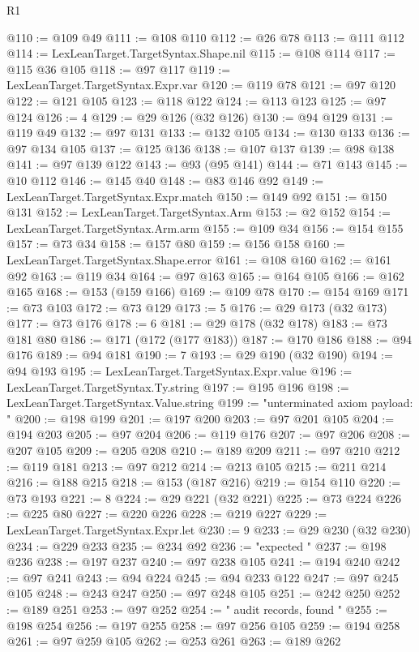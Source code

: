 \begin{lexlean}{R1}
\begin{coremodule}
{{{{{{{{{{{{{{{{{{{{{{{{{{{{{{{{{{{{{{{{{{{{{{{{{{{{{{{{{{{{{{{{{{{{{{{{{{{{{{{{{{{{{{{{{{{{{{{{{{{{{{{{{{{{{{{{{{{{{{{{{{{{{{{{{{{{{{{{{{{{{{{{{{{{{{{{{{{{{{{{{{{{{{{{{{{{{{{{{{{{{{{{{{@110 := @109 @49
@111 := @108 @110
@112 := @26 @78
@113 := @111 @112
@114 := LexLeanTarget.TargetSyntax.Shape.nil
@115 := @108 @114
@117 := @115 @36 @105
@118 := @97 @117
@119 := LexLeanTarget.TargetSyntax.Expr.var
@120 := @119 @78
@121 := @97 @120
@122 := @121 @105
@123 := @118 @122
@124 := @113 @123
@125 := @97 @124
@126 := 4
@129 := @29 @126 (@32 @126)
@130 := @94 @129
@131 := @119 @49
@132 := @97 @131
@133 := @132 @105
@134 := @130 @133
@136 := @97 @134 @105
@137 := @125 @136
@138 := @107 @137
@139 := @98 @138
@141 := @97 @139 @122
@143 := @93 (@95 @141)
@144 := @71 @143
@145 := @10 @112
@146 := @145 @40
@148 := @83 @146 @92
@149 := LexLeanTarget.TargetSyntax.Expr.match
@150 := @149 @92
@151 := @150 @131
@152 := LexLeanTarget.TargetSyntax.Arm
@153 := @2 @152
@154 := LexLeanTarget.TargetSyntax.Arm.arm
@155 := @109 @34
@156 := @154 @155
@157 := @73 @34
@158 := @157 @80
@159 := @156 @158
@160 := LexLeanTarget.TargetSyntax.Shape.error
@161 := @108 @160
@162 := @161 @92
@163 := @119 @34
@164 := @97 @163
@165 := @164 @105
@166 := @162 @165
@168 := @153 (@159 @166)
@169 := @109 @78
@170 := @154 @169
@171 := @73 @103
@172 := @73 @129
@173 := 5
@176 := @29 @173 (@32 @173)
@177 := @73 @176
@178 := 6
@181 := @29 @178 (@32 @178)
@183 := @73 @181 @80
@186 := @171 (@172 (@177 @183))
@187 := @170 @186
@188 := @94 @176
@189 := @94 @181
@190 := 7
@193 := @29 @190 (@32 @190)
@194 := @94 @193
@195 := LexLeanTarget.TargetSyntax.Expr.value
@196 := LexLeanTarget.TargetSyntax.Ty.string
@197 := @195 @196
@198 := LexLeanTarget.TargetSyntax.Value.string
@199 := "unterminated axiom payload: "
@200 := @198 @199
@201 := @197 @200
@203 := @97 @201 @105
@204 := @194 @203
@205 := @97 @204
@206 := @119 @176
@207 := @97 @206
@208 := @207 @105
@209 := @205 @208
@210 := @189 @209
@211 := @97 @210
@212 := @119 @181
@213 := @97 @212
@214 := @213 @105
@215 := @211 @214
@216 := @188 @215
@218 := @153 (@187 @216)
@219 := @154 @110
@220 := @73 @193
@221 := 8
@224 := @29 @221 (@32 @221)
@225 := @73 @224
@226 := @225 @80
@227 := @220 @226
@228 := @219 @227
@229 := LexLeanTarget.TargetSyntax.Expr.let
@230 := 9
@233 := @29 @230 (@32 @230)
@234 := @229 @233
@235 := @234 @92
@236 := "expected "
@237 := @198 @236
@238 := @197 @237
@240 := @97 @238 @105
@241 := @194 @240
@242 := @97 @241
@243 := @94 @224
@245 := @94 @233 @122
@247 := @97 @245 @105
@248 := @243 @247
@250 := @97 @248 @105
@251 := @242 @250
@252 := @189 @251
@253 := @97 @252
@254 := " audit records, found "
@255 := @198 @254
@256 := @197 @255
@258 := @97 @256 @105
@259 := @194 @258
@261 := @97 @259 @105
@262 := @253 @261
@263 := @189 @262
}}}}}}}}}}}}}}}}}}}}}}}}}}}}}}}}}}}}}}}}}}}}}}}}}}}}}}}}}}}}}}}}}}}}}}}}}}}}}}}}}}}}}}}}}}}}}}}}}}}}}}}}}}}}}}}}}}}}}}}}}}}}}}}}}}}}}}}}}}}}}}}}}}}}}}}}}}}}}}}}}}}}}}}}}}}}}}}}}}}}}}}}}}
\end{coremodule}
\end{lexlean}
